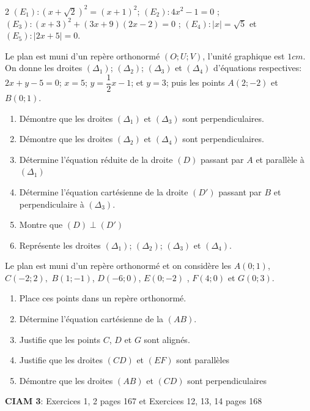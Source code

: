 \begin{multicols*}{2}
  	$(E_{1}): \left(x+\sqrt{2}\right)^2=\left(x+1\right)^2 $; $(E_{2}): 4x^2-1=0$ ; $(E_{3}): \left(x+3\right)^2+(3x+9)(2x-2)=0$ ; $(E_{4}): \left|x\right |=\sqrt{5} $ et  $(E_{5}): \left|2x+5\right |=0 $.
  	
  	\begin{center}
  	\end{center}
  	Le plan est muni d'un repère orthonormé $\left(O; U;V\right)$, l'unité graphique est $1 cm$. On donne les droites $({\Delta}_{1})$; $({\Delta}_{2})$; $({\Delta}_{3})$ et $({\Delta}_{4})$ d'équations respectives: $2x+y-5=0$; $x=5$; $y=\dfrac{1}{2}x-1$; et $y=3$; puis les points $A(2;-2)$ et  $B(0;1)$. 
  	\begin{enumerate}
  		\item Démontre que les droites $({\Delta}_{1})$ et $({\Delta}_{3})$ sont perpendiculaires. 
  		\item Démontre que les droites $({\Delta}_{2})$ et $({\Delta}_{4})$ sont perpendiculaires.
  		\item Détermine l'équation réduite de la droite $ (D) $ passant par $A$ et parallèle à $({\Delta}_{1})$ 
  		\item Détermine l'équation cartésienne de la droite $ (D') $ passant par $B$ et perpendiculaire à $({\Delta}_{3})$.
  		\item Montre que $ (D)\perp (D') $
  		\item  Représente les droites $({\Delta}_{1})$; $({\Delta}_{2})$; $({\Delta}_{3})$ et $({\Delta}_{4})$.
  	\end{enumerate}
  	\begin{center}
  	\end{center}
  	Le plan est muni d'un repère orthonormé et on considère les
  	$A(0;1)$, $ C(-2;2), $  $B(1;-1)$, $ D(-6;0) $, $ E(0;-2) $ , $ F(4;0) $  et $ G(0;3) $.
  	\begin{enumerate}
  		\item Place ces points dans un repère orthonormé.
  		\item Détermine l'équation cartésienne de la $ (AB) $.
  		\item Justifie que les points $ C $, $ D $ et $ G $ sont alignés.
  		\item Justifie que les droites $ (CD) $ et $ (EF) $ sont parallèles
  		\item Démontre que les droites $ (AB) $ et $ (CD) $ sont perpendiculaires 
  	\end{enumerate}
  	\begin{center}
  	\end{center}
  	\textbf{CIAM 3}: Exercices 1, 2 pages 167 et Exercices 12, 13, 14 pages 168  
  \end{multicols*}
